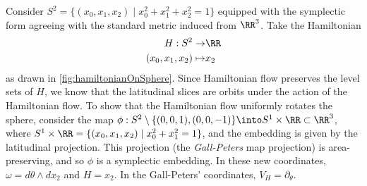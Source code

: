 

    Consider $S^2=\{(x_0, x_1, x_2)\;|\;x_0^2+x_1^2+x_2^2=1\}$  equipped with the symplectic form agreeing with the standard metric induced from $\RR^3$.
    Take the Hamiltonian 
    \begin{align*}
        H:S^2\to&\RR\\
        (x_0,x_1,x_2)\mapsto& x_2
    \end{align*}
    as drawn in \cref{fig:hamiltonianOnSphere}.
    Since Hamiltonian flow preserves the level sets of $H$, we know that the latitudinal slices are orbits under the action of the Hamiltonian flow. 
    To show that the Hamiltonian flow uniformly rotates the sphere, consider the map  $\phi:S^2\setminus\{(0,0,1), (0,0,-1)\}\into S^1\times \RR\subset \RR^3$, where $S^1\times \RR=\{(x_0, x_1, x_2)\;|\; x_0^2+x_1^2=1\}$, and the embedding is given by the latitudinal projection.
    This projection (the \emph{Gall-Peters} map projection) is area-preserving, and so $\phi$ is a symplectic embedding.
    In these new coordinates, $\omega=d\theta\wedge dx_2$ and $H=x_2$. In the Gall-Peters' coordinates,   $V_H=\partial_\theta$. 
    

